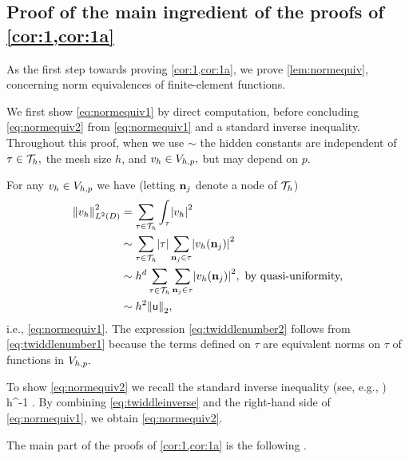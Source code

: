 \subsection{Proof of the main ingredient of the proofs of \cref{cor:1,cor:1a}}\label{sec:proofs}
As the first step towards proving \cref{cor:1,cor:1a}, we prove \cref{lem:normequiv}, concerning norm equivalences of finite-element functions.

\label{page:normequivpf}
We first show \cref{eq:normequiv1} by direct computation, before concluding \cref{eq:normequiv2} from \cref{eq:normequiv1} and a standard inverse inequality. Throughout this proof, when we use $\sim$ the hidden constants are independent of $\tau \in \mathcal T_{h},$ the mesh size $h$, and $v_{h} \in V_{h,p},$ but may depend on $p.$

For any $v_{h} \in V_{h,p}$ we have (letting $\mathbf{n}_{j}$ denote a node of $\mathcal T_{h}$)
\begin{align}
  \NLtD{\vh}^2 &= \sum_{\tau \in \Th} \int_\tau \abs{\vh}^2\label{eq:twiddlenumber1}\\
  &\sim \sum_{\tau \in \Th} \abs{\tau} \sum_{\bnj \in \tau} \abs{\vh(\bnj)}^2 \label{eq:twiddlenumber2}\\
  &\sim h^d \sum_{\tau \in \Th} \sum_{\bnj \in \tau} \abs{\vh(\bnj)}^2, \text{ by quasi-uniformity,}\nonumber\\
  &\sim h^2 \Nt{\uvec},
\end{align}
i.e., \cref{eq:normequiv1}. The expression \cref{eq:twiddlenumber2} follows from \cref{eq:twiddlenumber1} because the terms defined on $\tau$ are equivalent norms on $\tau$ of functions in $V_{h,p}.$

To show \cref{eq:normequiv2} we recall the standard inverse inequality (see, e.g., \cite[Theorem 4.5.11 and Remark 4.5.20]{BrSc:08})
\beq\label{eq:twiddleinverse}
\NHoD{\vh} \lesssim h^{-1} \NLtD{\vh}.
\eeq
By combining \cref{eq:twiddleinverse} and the right-hand side of \cref{eq:normequiv1}, we obtain \cref{eq:normequiv2}.
\epf


The main part of the proofs of \cref{cor:1,cor:1a} is the following .

